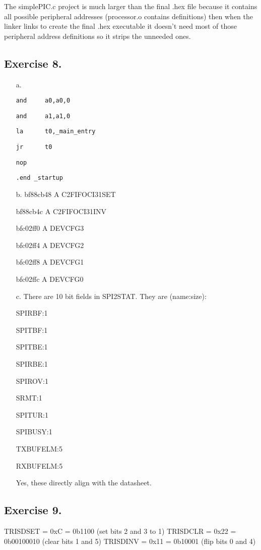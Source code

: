 \documentclass[12pt]{article}
\begin{document}
The simplePIC.c project is much larger than the final .hex file because it contains all possible peripheral addresses (processor.o contains definitions) then when the linker links to create the final .hex executable it doesn't need most of those peripheral address definitions so it strips the unneeded ones.


\subsection*{Exercise 8.}
\begin{itemize}
    \item [a.]

    \verb|and     a0,a0,0|

    \verb|and     a1,a1,0|

    \verb|la      t0,_main_entry|

    \verb|jr      t0|

    \verb|nop|

    \verb|.end _startup|


    \item [b.]
    bf88cb48 A C2FIFOCI31SET

    bf88cb4c A C2FIFOCI31INV
    
    bfc02ff0 A DEVCFG3

    bfc02ff4 A DEVCFG2

    bfc02ff8 A DEVCFG1

    bfc02ffc A DEVCFG0

    \item [c.]
    There are 10 bit fields in SPI2STAT.
    They are (name:size):

    SPIRBF:1

    SPITBF:1

    SPITBE:1

    SPIRBE:1
    
    SPIROV:1

    SRMT:1

    SPITUR:1

    SPIBUSY:1

    TXBUFELM:5

    RXBUFELM:5

    Yes, these directly align with the datasheet.

\end{itemize}

\subsection*{Exercise 9.}
TRISDSET = 0xC = 0b1100 (set bits 2 and 3 to 1)
TRISDCLR = 0x22 = 0b00100010 (clear bits 1 and 5)
TRISDINV = 0x11 = 0b10001 (flip bits 0 and 4)


\end{document}
